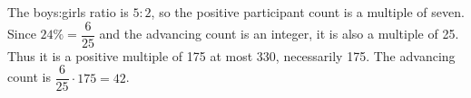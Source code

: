 The boys:girls ratio is $5:2$, so the positive participant count is a multiple of seven. Since $24\%=\dfrac{6}{25}$ and the advancing count is an integer, it is also a multiple of 25. Thus it is a positive multiple of 175 at most 330, necessarily 175. The advancing count is $\dfrac{6}{25}\cdot175=\boxed{42}$.

